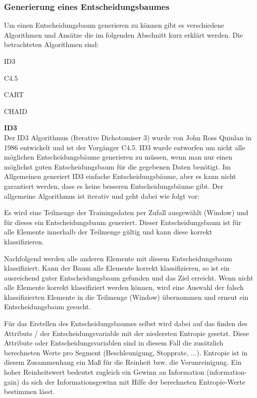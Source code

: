 \subsubsection{Generierung eines Entscheidungsbaumes}
\label{entscheidungsbaumAlgorithmen}
Um einen Entscheidungsbaum generieren zu können gibt es verschiedene Algorithmen und Ansätze die im folgenden Abschnitt kurz erklärt werden. Die betrachteten Algorithmen sind:
\begin{pitemize}
\item ID3
\item C4.5
\item CART
\item CHAID
\end{pitemize}

\textbf{ID3} \\
Der ID3 Algorithmus (Iterative Dichotomiser 3) wurde von John Ross Quinlan in 1986 entwickelt und ist der Vorgänger C4.5. ID3 wurde entworfen um nicht alle möglichen Entscheidungsbäume generieren zu müssen, wenn man nur einen möglichst guten Entscheidungsbaum für die gegebenen Daten benötigt. Im Allgemeinen generiert ID3 einfache Entscheidungsbäume, aber es kann nicht garantiert werden, dass es keine besseren Entscheidungsbäume gibt. Der allgemeine Algorithmus ist iterativ und geht dabei wie folgt vor: \cite{john_ross_quinlan_1986}

\begin{pitemize}
\item Es wird eine Teilmenge der Trainingsdaten per Zufall ausgewählt (Window) und für dieses ein Entscheidungsbaum generiert. Dieser Entscheidungsbaum ist für alle Elemente innerhalb der Teilmenge gültig und kann diese korrekt klassifizieren. 
\item Nachfolgend werden alle anderen Elemente mit diesem Entscheidungsbaum klassifiziert. Kann der Baum alle Elemente korrekt klassifizieren, so ist ein ausreichend guter Entscheidungsbaum gefunden und das Ziel erreicht. Wenn nicht alle Elemente korrekt klassifiziert werden können, wird eine Auswahl der falsch klassifizierten Elemente in die Teilmenge (Window) übernommen und erneut ein Entscheidungsbaum gesucht. 
\end{pitemize}

Für das Erstellen des Entscheidungsbaumes selbst wird dabei auf das finden des Attributs / der Entscheidungsvariable mit der niedersten Entropie gesetzt. Diese Attribute oder Entscheidungsvariablen sind in diesem Fall die zusätzlich berechneten Werte pro Segment (Beschleunigung, Stopprate, ...). Entropie ist in diesem Zusammenhang ein Maß für die Reinheit bzw. die Verunreinigung. \cite{howard_hamilton_machine_2009} Ein hoher Reinheitswert bedeutet zugleich ein Gewinn an Information (information-gain) da sich der Informationsgewinn mit Hilfe der berechneten Entropie-Werte bestimmen lässt. \cite{thomas_mitchell_which_1997}

